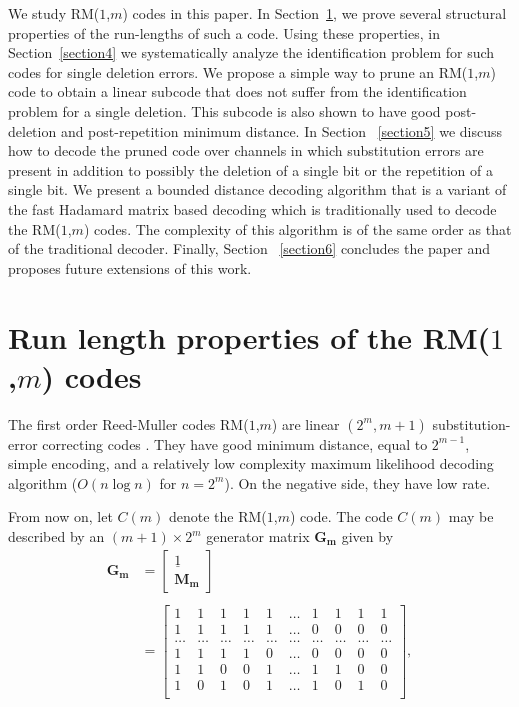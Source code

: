 We study RM($1$,$m$) codes in this paper. In
Section~\ref{section3}, we prove several structural properties of
the run-lengths of such a code. Using these properties, in
Section~\ref{section4} we systematically analyze the
identification problem for such codes for single deletion errors.
We propose a simple way to prune an RM($1$,$m$) code to obtain a
linear subcode that does not suffer from the identification
problem for a single deletion. This subcode is also shown to have
good post-deletion and post-repetition minimum distance. In
Section ~\ref{section5} we discuss how to decode the pruned code
over channels in which substitution errors are present in addition
to possibly the deletion of a single bit or the repetition of a
single bit. We present a bounded distance decoding algorithm that
is a variant of the fast Hadamard matrix based decoding which is
traditionally used to decode the RM($1$,$m$) codes. The complexity
of this algorithm is of the same order as that of the traditional
decoder. Finally, Section ~\ref{section6} concludes the paper and
proposes future extensions of this work.

\section{Run length properties of the RM($1$,$m$) codes}\label{section3}
The first order Reed-Muller codes RM($1$,$m$) are linear $(2^m,
m+1)$ substitution-error correcting codes \cite{mws:77}. They have
good minimum distance, equal to $2^{m-1}$, simple encoding, and a
relatively low complexity maximum likelihood decoding algorithm
($O(n \log n)$ for $n=2^m$). On the negative side, they have low
rate.

From now on, let $C(m)$ denote the RM($1$,$m$) code. The code
$C(m)$ may be described by an $(m+1) \times 2^m$ generator matrix
$\mathbf{G_m}$ given by
\begin{equation*}\label{eq:g}
 \begin{array}{lll} \mathbf{G_m} &=
\left[ \begin{array}{c} \underline{1} \\ \mathbf{M_m} \end{array} \right] \\
{} & {}\\
{} &=\left[ \begin{array}{cccccccccc}
1 & 1 & 1 & 1 & 1 & \ldots & 1 & 1 & 1 & 1 \\
1 & 1 & 1 & 1 & 1 & \ldots & 0 & 0 & 0 & 0 \\
\ldots & \ldots & \ldots & \ldots &\ldots &\ldots & \ldots & \ldots & \ldots &\ldots\\
1 & 1 & 1 & 1 & 0 & \ldots & 0 & 0 & 0 & 0 \\
1 & 1 & 0 & 0 & 1 & \ldots & 1 & 1 & 0 & 0 \\
1 & 0 & 1 & 0 & 1 & \ldots & 1 & 0 & 1 & 0\\
\end{array}\right],
\end{array}
\end{equation*}

